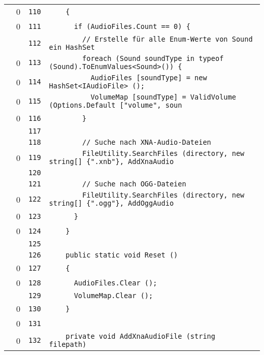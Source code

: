 \documentclass[a4paper,10pt]{article}
\begin{document}
\begin{longtable}[l]{lrrl}
\cellcolor{red} & 0 & \verb~110~ & \verb~    {~\\
\cellcolor{red} & 0 & \verb~111~ & \verb~      if (AudioFiles.Count == 0) {~\\
\cellcolor{gray} &  & \verb~112~ & \verb~        // Erstelle für alle Enum-Werte von Sound ein HashSet~\\
\cellcolor{red} & 0 & \verb~113~ & \verb~        foreach (Sound soundType in typeof (Sound).ToEnumValues<Sound>()) {~\\
\cellcolor{red} & 0 & \verb~114~ & \verb~          AudioFiles [soundType] = new HashSet<IAudioFile> ();~\\
\cellcolor{red} & 0 & \verb~115~ & \verb~          VolumeMap [soundType] = ValidVolume (Options.Default ["volume", soun~\\
\cellcolor{red} & 0 & \verb~116~ & \verb~        }~\\
\cellcolor{gray} &  & \verb~117~ & \verb~~\\
\cellcolor{gray} &  & \verb~118~ & \verb~        // Suche nach XNA-Audio-Dateien~\\
\cellcolor{red} & 0 & \verb~119~ & \verb~        FileUtility.SearchFiles (directory, new string[] {".xnb"}, AddXnaAudio~\\
\cellcolor{gray} &  & \verb~120~ & \verb~~\\
\cellcolor{gray} &  & \verb~121~ & \verb~        // Suche nach OGG-Dateien~\\
\cellcolor{red} & 0 & \verb~122~ & \verb~        FileUtility.SearchFiles (directory, new string[] {".ogg"}, AddOggAudio~\\
\cellcolor{red} & 0 & \verb~123~ & \verb~      }~\\
\cellcolor{red} & 0 & \verb~124~ & \verb~    }~\\
\cellcolor{gray} &  & \verb~125~ & \verb~~\\
\cellcolor{gray} &  & \verb~126~ & \verb~    public static void Reset ()~\\
\cellcolor{red} & 0 & \verb~127~ & \verb~    {~\\
\cellcolor{red} & 0 & \verb~128~ & \verb~      AudioFiles.Clear ();~\\
\cellcolor{gray} &  & \verb~129~ & \verb~      VolumeMap.Clear ();~\\
\cellcolor{red} & 0 & \verb~130~ & \verb~    }~\\
\cellcolor{red} & 0 & \verb~131~ & \verb~~\\
\cellcolor{red} & 0 & \verb~132~ & \verb~    private void AddXnaAudioFile (string filepath)~\\

\end{longtable}
\end{document}
